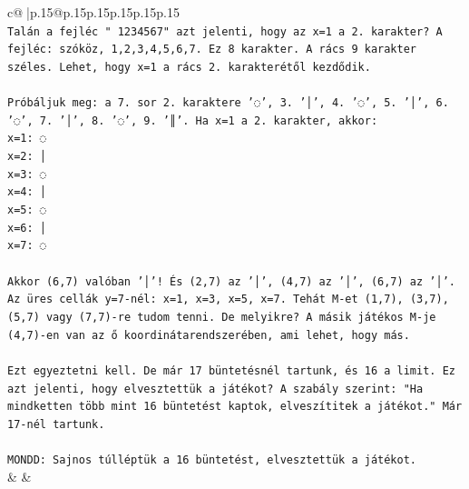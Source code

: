 \documentclass{article}
\begin{document}
{\begin{supertabular}{c@{$\;$}|p{.15\linewidth}@{}p{.15\linewidth}p{.15\linewidth}p{.15\linewidth}p{.15\linewidth}p{.15\linewidth}}
{{{\\ 
\texttt{Talán a fejléc " 1234567" azt jelenti, hogy az x=1 a 2. karakter? A fejléc: szóköz, 1,2,3,4,5,6,7. Ez 8 karakter. A rács 9 karakter széles. Lehet, hogy x=1 a rács 2. karakterétől kezdődik.} \\
\\ 
\texttt{Próbáljuk meg: a 7. sor 2. karaktere '◌', 3. '│', 4. '◌', 5. '│', 6. '◌', 7. '│', 8. '◌', 9. '║'. Ha x=1 a 2. karakter, akkor:} \\
\texttt{x=1: ◌} \\
\texttt{x=2: │} \\
\texttt{x=3: ◌} \\
\texttt{x=4: │} \\
\texttt{x=5: ◌} \\
\texttt{x=6: │} \\
\texttt{x=7: ◌} \\
\\ 
\texttt{Akkor (6,7) valóban '│'! És (2,7) az '│', (4,7) az '│', (6,7) az '│'. Az üres cellák y=7{-}nél: x=1, x=3, x=5, x=7. Tehát M{-}et (1,7), (3,7), (5,7) vagy (7,7){-}re tudom tenni. De melyikre? A másik játékos M{-}je (4,7){-}en van az ő koordinátarendszerében, ami lehet, hogy más.} \\
\\ 
\texttt{Ezt egyeztetni kell. De már 17 büntetésnél tartunk, és 16 a limit. Ez azt jelenti, hogy elvesztettük a játékot? A szabály szerint: "Ha mindketten több mint 16 büntetést kaptok, elveszítitek a játékot." Már 17{-}nél tartunk.} \\
\\ 
\texttt{MONDD: Sajnos túlléptük a 16 büntetést, elvesztettük a játékot.} \\
            }
        }
    }
    & & \\ \\


\end{supertabular}}
\end{document}
